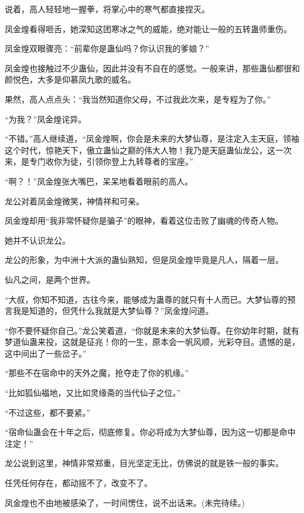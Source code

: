 \begin{this_body}
说着，高人轻轻地一握拳，将掌心中的寒气都直接捏灭。

凤金煌看得咂舌，她深知这团寒冰之气的威能，绝对能让一般的五转蛊师重伤。

凤金煌双眼骤亮：“前辈你是蛊仙吗？你认识我的爹娘？”

凤金煌也接触过不少蛊仙，因此并没有不自在的感觉。一般来讲，那些蛊仙都很和颜悦色，大多是仰慕凤九歌的威名。

果然，高人点点头：“我当然知道你父母，不过我此次来，是专程为了你。”

“为我？”凤金煌诧异。

“不错。”高人继续道，“凤金煌啊，你会是未来的大梦仙尊，是注定入主天庭，领袖这个时代，惊艳天下，傲立蛊仙之巅的伟大人物！我乃是天庭蛊仙龙公，这一次来，是专门收你为徒，引领你登上九转尊者的宝座。”

“啊？！”凤金煌张大嘴巴，呆呆地看着眼前的高人。

龙公对着凤金煌微笑，神情祥和可亲。

凤金煌却用“我非常怀疑你是骗子”的眼神，看着这位击败了幽魂的传奇人物。

她并不认识龙公。

龙公的形象，为中洲十大派的蛊仙熟知，但是凤金煌毕竟是凡人，隔着一层。

仙凡之间，是两个世界。

“大叔，你知不知道，古往今来，能够成为蛊尊的就只有十人而已。大梦仙尊的预言我是知道的，但凭什么我就是大梦仙尊？”凤金煌问道。

“你不要怀疑你自己。”龙公笑着道，“你就是未来的大梦仙尊。在你幼年时期，就有梦道仙蛊来投，这就是征兆！你的一生，原本会一帆风顺，光彩夺目。遗憾的是，这中间出了一些岔子。”

“那些不在宿命中的天外之魔，抢夺走了你的机缘。”

“比如狐仙福地，又比如灵缘斋的当代仙子之位。”

“不过这些，都不要紧。”

“宿命仙蛊会在十年之后，彻底修复。你必将成为大梦仙尊，因为这一切都是命中注定！”

龙公说到这里，神情非常郑重，目光坚定无比，仿佛说的就是铁一般的事实。

任凭任何存在，都动摇不了，改变不了。

凤金煌也不由地被感染了，一时间愣住，说不出话来。(未完待续。)

\end{this_body}

